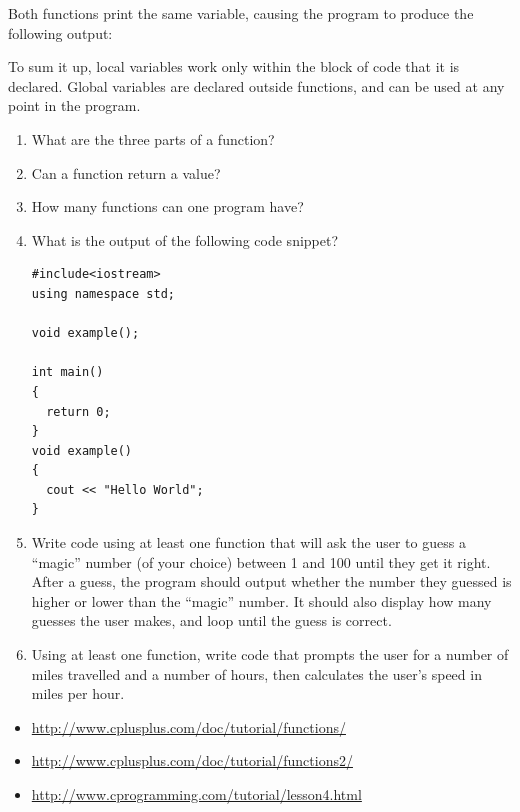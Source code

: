 Both functions print the same variable, causing the program to produce the following output: 

\noindent{}

\noindent{}

To sum it up, local variables work only within the block of code that it is declared. 
Global variables are declared outside functions, and can be used at any point in the program.



\begin{enumerate}
	\item What are the three parts of a function?
	\item Can a  function return a value?
	\item How many functions can one program have?
	\item What is the output of the following code snippet? \nopagebreak[4]

\noindent\begin{minipage}{\linewidth}\begin{lstlisting}
#include<iostream>
using namespace std;

void example();

int main()
{
  return 0;
}
void example()
{
  cout << "Hello World";  
}
\end{lstlisting}\end{minipage}

	\item Write code using at least one function that will ask the user to guess a ``magic'' number (of your choice) between 1 and 100 until they get it right. After a guess, the program should output whether the number they guessed is higher or lower than the ``magic'' number. It should also display how many guesses the user makes, and loop until the guess is correct.

  \item Using at least one function, write code that prompts the user for a number of miles travelled and a number of hours, then calculates the user's speed in miles per hour.

\end{enumerate}




\begin{itemize}
\item \url{http://www.cplusplus.com/doc/tutorial/functions/}
\item \url{http://www.cplusplus.com/doc/tutorial/functions2/}
\item \url{http://www.cprogramming.com/tutorial/lesson4.html}
\end{itemize}	




